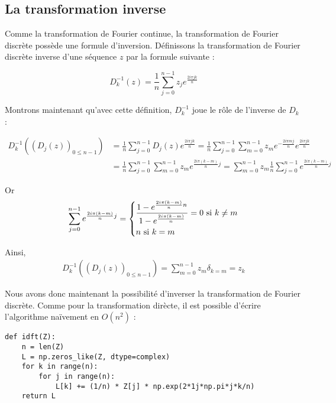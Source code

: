 \documentclass{article}
\begin{document}
\subsection{La transformation inverse}

Comme la transformation de Fourier continue, la transformation de Fourier discrète possède une formule d'inversion. Définissons la transformation de Fourier discrète inverse d'une séquence $z$ par la formule suivante :

$$ D_k^{-1}(z) = \frac{1}{n}\sum_{j=0}^{n-1}z_j e^{\frac{2i \pi j k}{n}} $$

Montrons maintenant qu'avec cette définition, $D_k^{-1}$ joue le rôle de l'inverse de $D_k$ :

\begin{align*}
  D_k^{-1}\left( \left(D_j(z)\right)_{0\le n-1} \right) 
  &= \frac{1}{n}\sum_{j=0}^{n-1}D_j(z) e^{\frac{2i \pi j k}{n}} 
  = \frac{1}{n}\sum_{j=0}^{n-1}\sum_{m=0}^{n-1}z_m e^{-\frac{2i \pi m j}{n}} e^{\frac{2i \pi j k}{n}}\\ 
  &= \frac{1}{n}\sum_{j=0}^{n-1}\sum_{m=0}^{n-1}z_m e^{\frac{2i \pi (k-m)}{n}j}  
  = \sum_{m=0}^{n-1}z_m \frac{1}{n}\sum_{j=0}^{n-1}e^{\frac{2i \pi (k-m)}{n}j}  
\end{align*}

Or 
\begin{equation*}
  \sum_{j=0}^{n-1}e^{\frac{2i \pi (k-m)}{n}j} = 
  \begin{dcases*}
    \frac{1 - e^{\frac{2i \pi (k-m)}{n}n}}{1 - e^\frac{2i \pi (k-m)}{n}} = 0 \text{ si } k \ne m \\
    n \text{ si } k = m 
  \end{dcases*}
  \label{eq_inv}
\end{equation*}

Ainsi, 
\begin{align*}
  D_k^{-1}\left( \left(D_j(z)\right)_{0\le n-1} \right) 
  = \sum_{m=0}^{n-1}z_m \delta_{k=m} = z_k  
\end{align*}

Nous avons donc maintenant la possibilité d'inverser la transformation de Fourier discrète. Comme pour la transformation dirècte, il est possible d'écrire l'algorithme naïvement en $O(n^2)$ :
\begin{verbatim}
def idft(Z):
    n = len(Z)
    L = np.zeros_like(Z, dtype=complex)
    for k in range(n):
        for j in range(n):
            L[k] += (1/n) * Z[j] * np.exp(2*1j*np.pi*j*k/n)
    return L
\end{verbatim}
\end{document}

